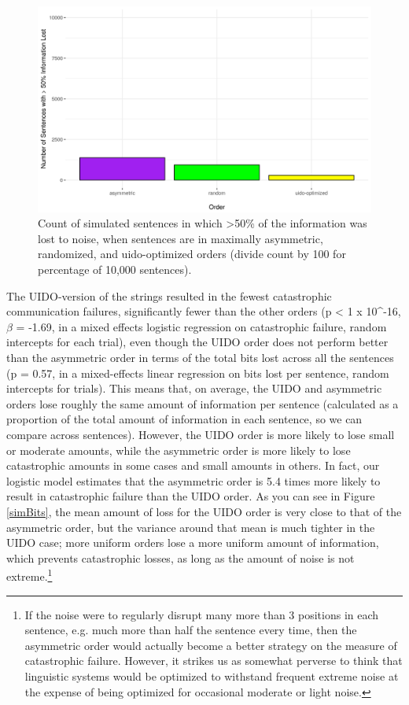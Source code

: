\documentclass[12pt]{article}
\begin{document}
\begin{figure}
	\begin{center}
		\includegraphics[width=.95\textwidth]{uid-sim-majority.png}
		\caption{Count of simulated sentences in which >50\% of the information was lost to noise, when sentences are in maximally asymmetric, randomized, and uido-optimized orders (divide count by 100 for percentage of 10,000 sentences).}
		\label{simMaj}
	\end{center}
\end{figure}

The UIDO-version of the strings resulted in the fewest catastrophic communication failures, significantly fewer than the other orders (p < 1 x 10^{-16}, $\beta$ = -1.69, in a mixed effects logistic regression on catastrophic failure, random intercepts for each trial), even though the UIDO order does not perform better than the asymmetric order in terms of the total bits lost across all the sentences (p = 0.57, in a mixed-effects linear regression on bits lost per sentence, random intercepts for trials). This means that, on average, the UIDO and asymmetric orders lose roughly the same amount of information per sentence (calculated as a proportion of the total amount of information in each sentence, so we can compare across sentences). However, the UIDO order is more likely to lose small or moderate amounts, while the asymmetric order is more likely to lose catastrophic amounts in some cases and small amounts in others.  In fact, our logistic model estimates that the asymmetric order is 5.4 times more likely to result in catastrophic failure than the UIDO order. As you can see in Figure \ref{simBits}, the mean amount of loss for the UIDO order is very close to that of the asymmetric order, but the variance around that mean is much tighter in the UIDO case; more uniform orders lose a more uniform amount of information, which prevents catastrophic losses, as long as the amount of noise is not extreme.\footnote{If the noise were to regularly disrupt many more than 3 positions in each sentence, e.g. much more than half the sentence every time, then the asymmetric order would actually become a better strategy on the measure of catastrophic failure. However, it strikes us as somewhat perverse to think that linguistic systems would be optimized to withstand frequent extreme noise at the expense of being optimized for occasional moderate or light noise.}
\end{document}

